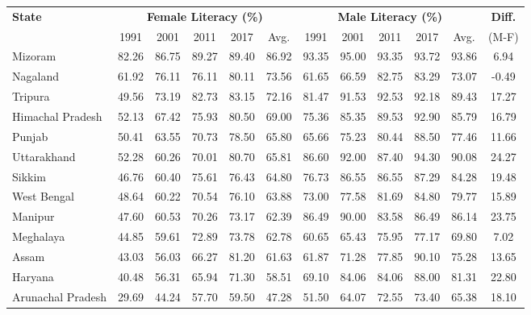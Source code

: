 \begin{table}[h]
    \centering
    \begin{tabular}{lccccccccccc}
        \toprule
        \textbf{State} & \multicolumn{5}{c}{\textbf{Female Literacy (\%)}} & \multicolumn{5}{c}{\textbf{Male Literacy (\%)}} & \textbf{Diff.} \\
        \cmidrule(lr){2-6} \cmidrule(lr){7-11}
        & 1991 & 2001 & 2011 & 2017 & Avg. & 1991 & 2001 & 2011 & 2017 & Avg. & (M-F) \\
        \midrule
        Mizoram          & 82.26 & 86.75 & 89.27 & 89.40 & 86.92 & 93.35 & 95.00 & 93.35 & 93.72 & 93.86 & 6.94 \\
        Nagaland        & 61.92 & 76.11 & 76.11 & 80.11 & 73.56 & 61.65 & 66.59 & 82.75 & 83.29 & 73.07 & -0.49 \\
        Tripura         & 49.56 & 73.19 & 82.73 & 83.15 & 72.16 & 81.47 & 91.53 & 92.53 & 92.18 & 89.43 & 17.27 \\
        Himachal Pradesh & 52.13 & 67.42 & 75.93 & 80.50 & 69.00 & 75.36 & 85.35 & 89.53 & 92.90 & 85.79 & 16.79 \\
        Punjab          & 50.41 & 63.55 & 70.73 & 78.50 & 65.80 & 65.66 & 75.23 & 80.44 & 88.50 & 77.46 & 11.66 \\
        Uttarakhand     & 52.28 & 60.26 & 70.01 & 80.70 & 65.81 & 86.60 & 92.00 & 87.40 & 94.30 & 90.08 & 24.27 \\
        Sikkim          & 46.76 & 60.40 & 75.61 & 76.43 & 64.80 & 76.73 & 86.55 & 86.55 & 87.29 & 84.28 & 19.48 \\
        West Bengal     & 48.64 & 60.22 & 70.54 & 76.10 & 63.88 & 73.00 & 77.58 & 81.69 & 84.80 & 79.77 & 15.89 \\
        Manipur         & 47.60 & 60.53 & 70.26 & 73.17 & 62.39 & 86.49 & 90.00 & 83.58 & 86.49 & 86.14 & 23.75 \\
        Meghalaya       & 44.85 & 59.61 & 72.89 & 73.78 & 62.78 & 60.65 & 65.43 & 75.95 & 77.17 & 69.80 & 7.02 \\
        Assam           & 43.03 & 56.03 & 66.27 & 81.20 & 61.63 & 61.87 & 71.28 & 77.85 & 90.10 & 75.28 & 13.65 \\
        Haryana         & 40.48 & 56.31 & 65.94 & 71.30 & 58.51 & 69.10 & 84.06 & 84.06 & 88.00 & 81.31 & 22.80 \\
        Arunachal Pradesh & 29.69 & 44.24 & 57.70 & 59.50 & 47.28 & 51.50 & 64.07 & 72.55 & 73.40 & 65.38 & 18.10 \\

\end{tabular}
\end{table}
